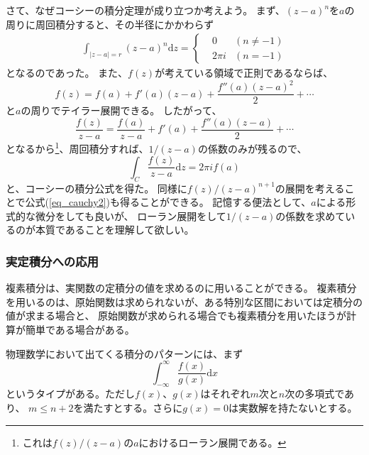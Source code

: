 \documentclass{jarticle}
\newcommand{\diff}{\mathrm d}
\begin{document}
さて、なぜコーシーの積分定理が成り立つか考えよう。
まず、$(z-a)^n$を$a$の周りに周回積分すると、その半径にかかわらず
\begin{eqnarray}
  \int_{|z-a|=r} (z-a)^n \diff z=
  \left\{
  \begin{array}{ccc}
     & 0      & (n \neq -1) \\
     & 2\pi i & (n = -1)
  \end{array}
  \right.
\end{eqnarray}
となるのであった。
また、$f(z)$が考えている領域で正則であるならば、
\begin{equation}
  f(z) = f(a) + f'(a) (z-a) + \frac{f''(a)(z-a)^2}{2} + \cdots
\end{equation}
と$a$の周りでテイラー展開できる。
したがって、
\begin{equation}
  \frac{f(z)}{z-a} = \frac{f(a)}{z-a} + f'(a) + \frac{f''(a)(z-a)}{2} + \cdots
\end{equation}
となるから\footnote{%
  これは$f(z)/(z-a)$の$a$におけるローラン展開である。
}、周回積分すれば、$1/(z-a)$の係数のみが残るので、
\begin{equation}
  \int_C \frac{f(z)}{z-a} \diff z = 2\pi i f(a)
\end{equation}
と、コーシーの積分公式を得た。
同様に$f(z)/(z-a)^{n+1}$の展開を考えることで公式(\ref{eq_cauchy2})も得ることができる。
記憶する便法として、$a$による形式的な微分をしても良いが、
ローラン展開をして$1/(z-a)$の係数を求めているのが本質であることを理解して欲しい。

\subsubsection{実定積分への応用}

複素積分は、実関数の定積分の値を求めるのに用いることができる。
複素積分を用いるのは、原始関数は求められないが、ある特別な区間においては定積分の値が求まる場合と、
原始関数が求められる場合でも複素積分を用いたほうが計算が簡単である場合がある。

物理数学において出てくる積分のパターンには、まず
\begin{equation}
  \int_{-\infty}^{\infty} \frac{f(x)}{g(x)} \diff x
\end{equation}
というタイプがある。ただし$f(x)$、$g(x)$はそれぞれ$m$次と$n$次の多項式であり、
$m\le n + 2$を満たすとする。さらに$g(x)=0$は実数解を持たないとする。
\end{document}
